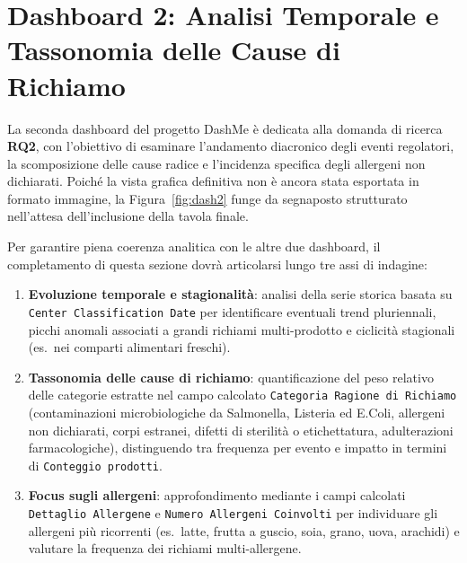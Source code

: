 \section{Dashboard 2: Analisi Temporale e Tassonomia delle Cause di Richiamo}
\label{subsec:dash2}

La seconda dashboard del progetto DashMe è dedicata alla domanda di ricerca \textbf{RQ2}, con l'obiettivo di esaminare l'andamento diacronico degli eventi regolatori, la scomposizione delle cause radice e l'incidenza specifica degli allergeni non dichiarati. Poiché la vista grafica definitiva non è ancora stata esportata in formato immagine, la Figura~\ref{fig:dash2} funge da segnaposto strutturato nell'attesa dell'inclusione della tavola finale.


Per garantire piena coerenza analitica con le altre due dashboard, il completamento di questa sezione dovrà articolarsi lungo tre assi di indagine:
\begin{enumerate}
    \item \textbf{Evoluzione temporale e stagionalità}: analisi della serie storica basata su \texttt{Center Classification Date} per identificare eventuali trend pluriennali, picchi anomali associati a grandi richiami multi-prodotto e ciclicità stagionali (es.\ nei comparti alimentari freschi). 
    \item \textbf{Tassonomia delle cause di richiamo}: quantificazione del peso relativo delle categorie estratte nel campo calcolato \texttt{Categoria Ragione di Richiamo} (contaminazioni microbiologiche da Salmonella, Listeria ed E.Coli, allergeni non dichiarati, corpi estranei, difetti di sterilità o etichettatura, adulterazioni farmacologiche), distinguendo tra frequenza per evento e impatto in termini di \texttt{Conteggio prodotti}. 
    \item \textbf{Focus sugli allergeni}: approfondimento mediante i campi calcolati \texttt{Dettaglio Allergene} e \texttt{Numero Allergeni Coinvolti} per individuare gli allergeni più ricorrenti (es.\ latte, frutta a guscio, soia, grano, uova, arachidi) e valutare la frequenza dei richiami multi-allergene. 
\end{enumerate}

